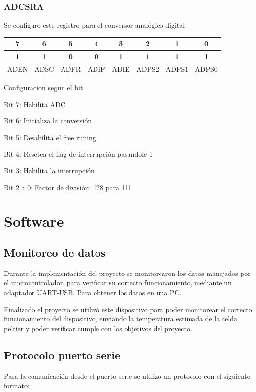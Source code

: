 \documentclass[10pt,spanish,a4paper,openany,notitlepage]{article}
\begin{document}
\subsubsection{ADCSRA}
Se configuro este registro para el conversor analógico digital
\begin{center}
\begin{tabular}{|c|c|c|c|c|c|c|c|}\hline
7&6&5&4&3&2&1&0\\\hline
\textbf{1}&\textbf{1}&\textbf{0}&\textbf{0}&\textbf{1}&\textbf{1}&\textbf{1}&\textbf{1}\\\hline
ADEN&ADSC&ADFR&ADIF&ADIE&ADPS2&ADPS1&ADPS0\\\hline
\end{tabular}
\end{center}

\begin{description}
\item{Configuracion segun el bit}
\item{Bit 7}: Habilita ADC
\item{Bit 6}: Inicializa la conversión
\item{Bit 5}: Desabilita el free runing
\item{Bit 4}: Resetea el flag de interrupción pasandole 1
\item{Bit 3}: Habilita la interrupción
\item{Bit 2 a 0}: Factor de división: 128 para 111
\end{description}

\section{Software}

\subsection{Monitoreo de datos}

Durante la implementación del proyecto se monitorearon los datos manejados
por el microcontrolador, para verificar su correcto funcionamiento, mediante
un adaptador UART-USB. Para obtener los datos en una PC.

Finalizado el proyecto se utilizó este dispositivo para poder monitorear
el correcto funcionamiento del dispositivo, enviando la temperatura
estimada de la celda peltier y poder verificar cumple con los objetivos del proyecto.

\subsection{Protocolo puerto serie}
Para la comunicación desde el puerto serie se utilizo un protocolo con el siguiente formato:
\end{document}
